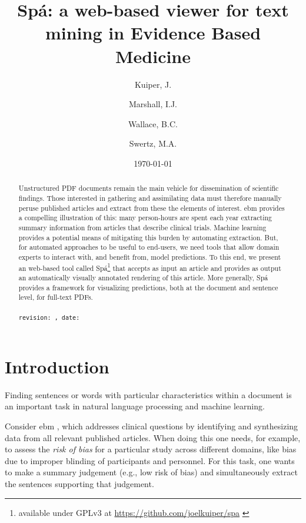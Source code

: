 \documentclass[runningheads,a4paper]{llncs}
\institute{
  University of Groningen P.O. Box 30001, 9700 RB Groningen \\ \mailsa
  \and King's College London, London SE1 3QD, UK \\ \mailsb
  \and Brown University, Providence, RI 02906, USA \\ \mailsc}
\begin{document}
\setcounter{tocdepth}{3}
\newcommand{\highlight}[1]{\colorbox{yellow}{#1}}


\author{Kuiper, J. \and Marshall, I.J. \and Wallace, B.C. \and Swertz, M.A.}
\date{\today}
\title{Spá: a web-based viewer for text mining in Evidence Based Medicine}


\maketitle
\begin{abstract}
Unstructured PDF documents remain the main vehicle for dissemination of scientific findings.
Those interested in gathering and assimilating data must therefore manually peruse published articles and extract from these the elements of interest.
\acl{ebm} provides a compelling illustration of this: many person-hours are spent each year extracting summary information from articles that describe clinical trials.
Machine learning provides a potential means of mitigating this burden by automating extraction.
But, for automated approaches to be useful to end-users, we need tools that allow domain experts to interact with, and benefit from, model predictions.
To this end, we present an web-based tool called Spá\footnote{available under GPLv3 at \url{https://github.com/joelkuiper/spa} \cite{kuiper2014}} that accepts as input an article and provides as output an automatically visually annotated rendering of this article.
More generally, Spá provides a framework for visualizing predictions, both at the document and sentence level, for full-text PDFs.
\\
\\
\texttt{revision: \revision, date: \revisiondate}
\end{abstract}

\acresetall

\section{Introduction}
\label{section:intro}
Finding sentences or words with particular characteristics within a document is an important task in natural language processing and machine learning.

Consider \ac{ebm} \cite{sackett1996}, which addresses clinical questions by identifying and synthesizing data from all relevant published articles.
When doing this one needs, for example, to assess the \emph{risk of bias} for a particular study across different domains, like bias due to improper blinding of participants and personnel.
For this task, one wants to make a summary judgement (e.g., low risk of bias) and simultaneously extract the sentences supporting that judgement.
\end{document}
